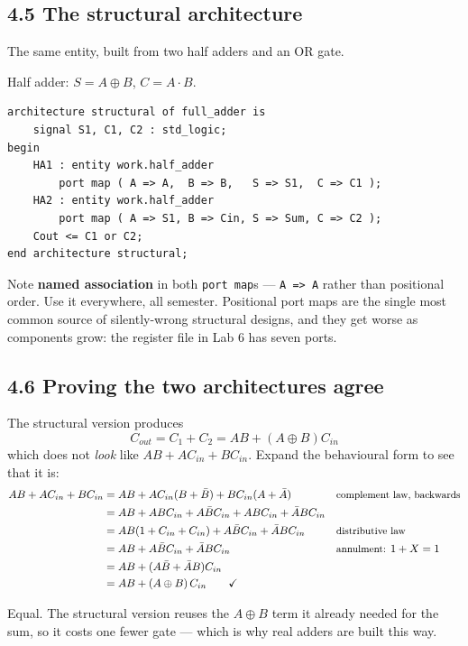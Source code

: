 \documentclass[11pt]{article}
\newcommand{\code}[1]{\texttt{#1}}
\begin{document}
\subsection*{4.5 The structural architecture}

The same entity, built from two half adders and an OR gate.

Half adder: $S = A \oplus B$, \quad $C = A \cdot B$.

\begin{lstlisting}
architecture structural of full_adder is
    signal S1, C1, C2 : std_logic;
begin
    HA1 : entity work.half_adder
        port map ( A => A,  B => B,   S => S1,  C => C1 );
    HA2 : entity work.half_adder
        port map ( A => S1, B => Cin, S => Sum, C => C2 );
    Cout <= C1 or C2;
end architecture structural;
\end{lstlisting}

Note \textbf{named association} in both \code{port map}s --- \code{A => A} rather
than positional order. Use it everywhere, all semester. Positional port maps are the
single most common source of silently-wrong structural designs, and they get worse
as components grow: the register file in Lab 6 has seven ports.

\subsection*{4.6 Proving the two architectures agree}

The structural version produces
\[
C_{out} = C_1 + C_2 = AB + (A \oplus B)C_{in}
\]
which does not \emph{look} like $AB + AC_{in} + BC_{in}$. Expand the behavioural
form to see that it is:
\begin{align*}
AB + AC_{in} + BC_{in}
&= AB + AC_{in}(B + \bar{B}) + BC_{in}(A + \bar{A}) && \text{\small complement law, backwards} \\
&= AB + ABC_{in} + A\bar{B}C_{in} + ABC_{in} + \bar{A}BC_{in} \\
&= AB(1 + C_{in} + C_{in}) + A\bar{B}C_{in} + \bar{A}BC_{in} && \text{\small distributive law} \\
&= AB + A\bar{B}C_{in} + \bar{A}BC_{in} && \text{\small annulment: } 1 + X = 1\\
&= AB + (A\bar{B} + \bar{A}B)C_{in} \\
&= AB + (A \oplus B)\,C_{in} \qquad\checkmark
\end{align*}

Equal. The structural version reuses the $A \oplus B$ term it already needed for the
sum, so it costs one fewer gate --- which is why real adders are built this way.
\end{document}
